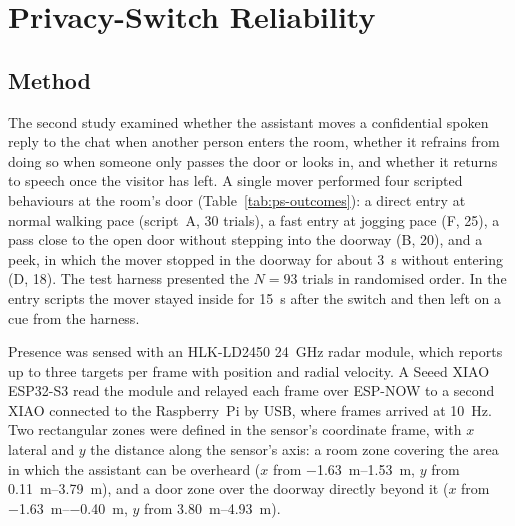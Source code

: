 
\section{Privacy-Switch Reliability}
\label{sec:privacy-switch}

\subsection{Method}
\label{sec:ps-method}

The second study examined whether the assistant moves a confidential spoken
reply to the chat when another person enters the room, whether it refrains
from doing so when someone only passes the door or looks in, and whether it
returns to speech once the visitor has left. A single mover performed four
scripted behaviours at the room's door (Table~\ref{tab:ps-outcomes}): a direct
entry at normal walking pace (script~A, 30 trials), a fast entry at jogging
pace (F, 25), a pass close to the open door without stepping into the doorway
(B, 20), and a peek, in which the mover stopped in the doorway for about
\SI{3}{\second} without entering (D, 18). The test harness presented the
$N = 93$ trials in randomised order. In the entry scripts the mover stayed
inside for \SI{15}{\second} after the switch and then left on a cue from the
harness.

Presence was sensed with an HLK-LD2450 \SI{24}{\giga\hertz} radar module, which
reports up to three targets per frame with position and radial velocity. A
Seeed XIAO ESP32-S3 read the module and relayed each frame over ESP-NOW to a
second XIAO connected to the Raspberry~Pi by USB, where frames arrived at
\SI{10}{\hertz}. Two rectangular zones were defined in the sensor's coordinate
frame, with $x$ lateral and $y$ the distance along the sensor's axis: a room
zone covering the area in which the assistant can be overheard ($x$ from
\SIrange{-1.63}{1.53}{\metre}, $y$ from \SIrange{0.11}{3.79}{\metre}), and a
door zone over the doorway directly beyond it ($x$ from
\SIrange{-1.63}{-0.40}{\metre}, $y$ from \SIrange{3.80}{4.93}{\metre}).


